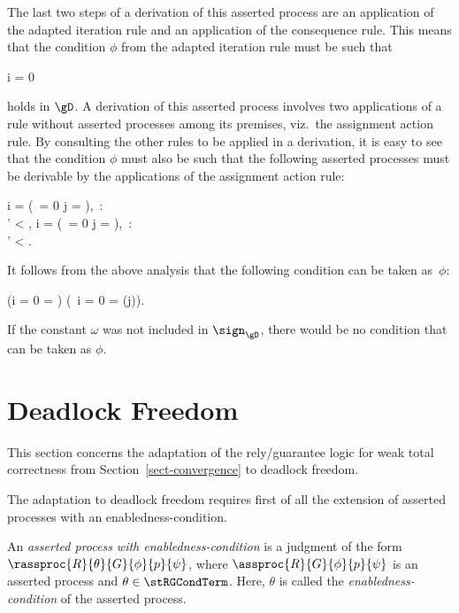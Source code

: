 \documentclass[runningheads]{llncs}
\begin{document}
The last two steps of a derivation of this asserted process are an 
application of the adapted iteration rule and an application of the 
consequence rule.
This means that the condition $\phi$ from the adapted iteration rule 
must be such that
\begin{ldispl}
i = 0 \Limpl {}
\end{ldispl}%
holds in $\gD$.
%
A derivation of this asserted process involves two applications of a 
rule without asserted processes among its premises, viz.\ the 
assignment action rule.
By consulting the other rules to be applied in a derivation, it is 
easy to see that the condition $\phi$ must also be such that the 
following asserted processes must be derivable by the applications of 
the assignment action rule:
\begin{ldispl}
\langle i =  \Land
         (\Lnot\,  = 0 \Limpl j = ),\True\, 
\rangle : \\ \qquad
{}
 {
   {\phi{} \Land \alpha' < \alpha}}\;, 
\eqnsep 
\langle i =  \Land
         (\Lnot\,  = 0 \Limpl j = ),\True\,
\rangle : \\ \qquad
{}
 {
   {\phi{} \Land \alpha' < \alpha}}\;.
\end{ldispl}%
%
It follows from the above analysis that the following condition can be 
taken as~$\phi$: 
\begin{ldispl}
(i = 0 \Limpl \alpha = \omega) \Land
(\Lnot\, i = 0 \Limpl \alpha = \ord(j))\;.
\end{ldispl}%
If the constant $\omega$ was not included in $\sign_\gD$, there would be 
no condition that can be taken as $\phi$.

\section{Deadlock Freedom}
\label{sect-deadlock-freedom}

This section concerns the adaptation of the rely/guarantee logic for 
weak total correctness from Section~\ref{sect-convergence} to deadlock 
freedom.

The adaptation to deadlock freedom requires first of all the extension
of asserted processes with an enabledness-condition.

An \emph{asserted process with enabledness-condition} 
is a judgment of the form $\rassproc{R}{\theta}{G}{\phi}{p}{\psi}$, 
where $\assproc{R}{G}{\phi}{p}{\psi}$ is an asserted process and
$\theta \in \stRGCondTerm$.  
Here, $\theta$ is called the \emph{enabledness-condition} of the 
asserted process.
\end{document}
